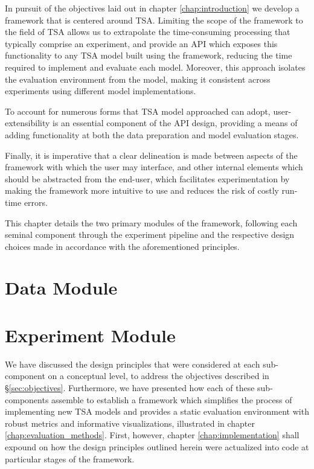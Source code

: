 \documentclass[../../fyp.tex]{subfiles}
\begin{document}
In pursuit of the objectives laid out in chapter \ref{chap:introduction} we develop a framework that is centered around TSA. Limiting the scope of the framework to the field of TSA allows us to extrapolate the time-consuming processing that typically comprise an experiment, and provide an API which exposes this functionality to any TSA model built using the framework, reducing the time required to implement and evaluate each model. 
Moreover, this approach isolates the evaluation environment from the model, making it consistent across experiments using different model implementations.

To account for numerous forms that TSA model approached can adopt, user-extensibility is an essential component of the API design, providing a means of adding functionality at both the data preparation and model evaluation stages. 

Finally, it is imperative that a clear delineation is made between aspects of the framework with which the user may interface, and other internal elements which should be abstracted from the end-user, which facilitates experimentation by making the framework more intuitive to use and reduces the risk of costly run-time errors.  

This chapter details the two primary modules of the framework, following each seminal component through the experiment pipeline and the respective design choices made in accordance with the aforementioned principles.

\section{Data Module}


\section{Experiment Module} \label{sec:experiment_module}


We have discussed the design principles that were considered at each sub-component on a conceptual level, to address the objectives described in \S\ref{sec:objectives}. Furthermore, we have presented how each of these sub-components assemble to establish a framework which simplifies the process of implementing new TSA models and provides a static evaluation environment with robust metrics and informative visualizations, illustrated in chapter \ref{chap:evaluation_methods}. First, however, chapter \ref{chap:implementation} shall expound on how the design principles outlined herein were actualized into code at particular stages of the framework.
\end{document}
